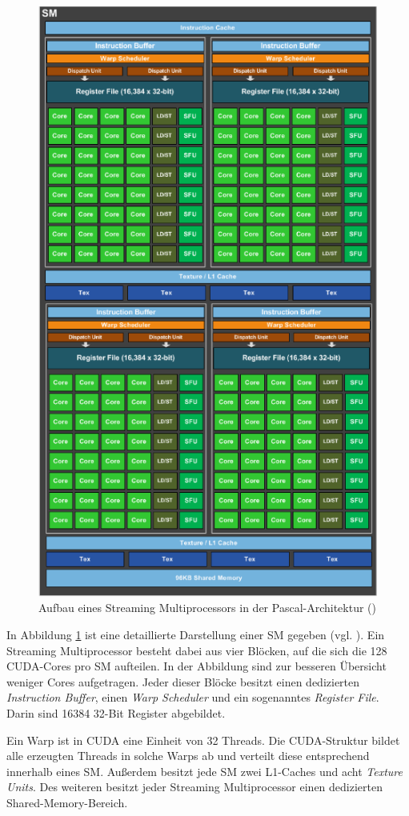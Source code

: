 \documentclass[../main.tex]{subfiles}
\begin{document}
\begin{figure}[!htbp]
	\centering
	\includegraphics[width=0.8\linewidth]{../images/Riedle/architektur_pascal.png}
	\caption{Aufbau eines Streaming Multiprocessors in der Pascal-Architektur (\cite{Pascal_white})} \label{pic:cuda_sm}
\end{figure}
In Abbildung \ref{pic:cuda_sm} ist eine detaillierte Darstellung einer SM gegeben (vgl. \cite{Pascal_white}). Ein Streaming Multiprocessor besteht dabei aus vier Blöcken, auf die sich die 128 CUDA-Cores pro SM aufteilen. In der Abbildung sind zur besseren Übersicht weniger Cores aufgetragen. Jeder dieser Blöcke besitzt einen dedizierten \emph{Instruction Buffer}, einen \emph{Warp Scheduler} und ein sogenanntes \emph{Register File}. Darin sind 16384 32-Bit Register abgebildet. \par 
Ein Warp ist in CUDA eine Einheit von 32 Threads. Die CUDA-Struktur bildet alle erzeugten Threads in solche Warps ab und verteilt diese entsprechend innerhalb eines SM. Außerdem besitzt jede SM zwei L1-Caches und acht \emph{Texture Units}. Des weiteren besitzt jeder Streaming Multiprocessor einen dedizierten Shared-Memory-Bereich.\par 
\end{document}
